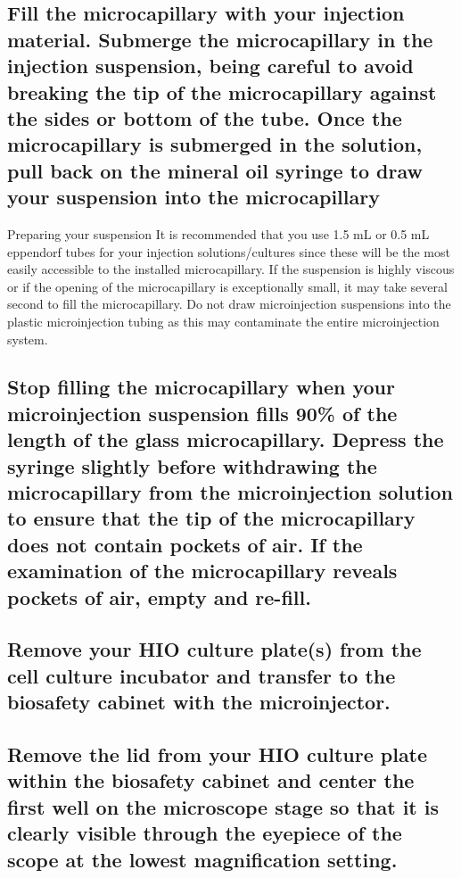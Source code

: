 \documentclass[11pt]{article}
\begin{document}
\subsection{{\sffamily } Fill the microcapillary with your injection material. Submerge the microcapillary in the injection suspension, being careful to avoid breaking the tip of the microcapillary against the sides or bottom of the tube. Once the microcapillary is submerged in the solution, pull back on the mineral oil syringe to draw your suspension into the microcapillary}
\label{sec:orgheadline43}
\begin{bclogo}[logo=\bcinfo, couleurBarre=Black, noborder=true, couleur=gray!10]{     Preparing your suspension}
It is recommended that you use 1.5 mL or 0.5 mL eppendorf tubes for your injection solutions/cultures since these will be the most easily accessible to the installed microcapillary. If the suspension is highly viscous or if the opening of the microcapillary is exceptionally small, it may take several second to fill the microcapillary. Do not draw microinjection suspensions into the plastic microinjection tubing as this may contaminate the entire microinjection system.\\
\end{bclogo}

\subsection{{\sffamily } Stop filling the microcapillary when your microinjection suspension fills 90\% of the length of the glass microcapillary. Depress the syringe slightly before withdrawing the microcapillary from the microinjection solution to ensure that the tip of the microcapillary does not contain pockets of air. If the examination of the microcapillary reveals pockets of air, empty and re-fill.}
\label{sec:orgheadline44}
\subsection{{\sffamily } Remove your HIO culture plate(s) from the cell culture incubator and transfer to the biosafety cabinet with the microinjector.}
\label{sec:orgheadline45}
\subsection{{\sffamily } Remove the lid from your HIO culture plate within the biosafety cabinet and center the first well on the microscope stage so that it is clearly visible through the eyepiece of the scope at the lowest magnification setting.}
\label{sec:orgheadline46}
\end{document}
